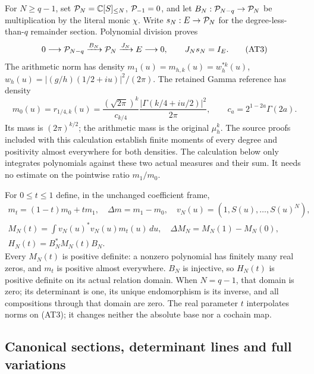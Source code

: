For $N\ge q-1$, set $\mathcal P_N=\mathbb C[S]_{\le N}$,
$\mathcal P_{-1}=0$, and let
$B_N:\mathcal P_{N-q}\to\mathcal P_N$ be multiplication by the literal monic
$\chi$. Write $s_N:E\to\mathcal P_N$ for the degree-less-than-$q$
remainder section. Polynomial division proves
\[
 0\longrightarrow\mathcal P_{N-q}\xrightarrow{B_N}\mathcal P_N
       \xrightarrow{J_N}E\longrightarrow0,
 \qquad J_Ns_N=I_E.                         \tag{AT3}
\]
The arithmetic norm has density
$m_1(u)=m_{h,k}(u)=w_h^{*k}(u)$,
$w_h(u)=|(g/h)(1/2+iu)|^2/(2\pi)$.
The retained Gamma reference has density
\[
 m_0(u)=r_{1/4,k}(u)
 =\frac{(\sqrt{2\pi})^k}{c_{k/4}}
       \frac{|\Gamma(k/4+iu/2)|^2}{2\pi},
 \qquad c_a=2^{1-2a}\Gamma(2a).              \tag{AT4}
\]
Its mass is $(2\pi)^{k/2}$; the arithmetic mass is the original
$\mu_h^k$. The source proofs included with this calculation establish
finite moments of every degree and positivity almost everywhere for
both densities. The calculation below only integrates polynomials
against these two actual measures and their sum. It needs no estimate
on the pointwise ratio $m_1/m_0$.

For $0\le t\le1$ define, in the unchanged coefficient frame,
\[
 \begin{gathered}
 m_t=(1-t)m_0+tm_1,\quad \Delta m=m_1-m_0,
 \quad v_N(u)=(1,S(u),\ldots,S(u)^N),\\
 M_N(t)=\int v_N(u)^*v_N(u)m_t(u)\,du,
 \quad \Delta M_N=M_N(1)-M_N(0),\\
 H_N(t)=B_N^*M_N(t)B_N.                     \end{gathered}
 \tag{AT5}
\]
Every $M_N(t)$ is positive definite: a nonzero polynomial has finitely
many real zeros, and $m_t$ is positive almost everywhere. $B_N$ is
injective, so $H_N(t)$ is positive definite on its actual relation
domain. When $N=q-1$, that domain is zero; its determinant is one,
its unique endomorphism is its inverse, and all compositions through
that domain are zero. The real parameter $t$ interpolates norms on
(AT3); it changes neither the absolute base nor a cochain map.

\subsection{Canonical sections, determinant lines and full variations}

